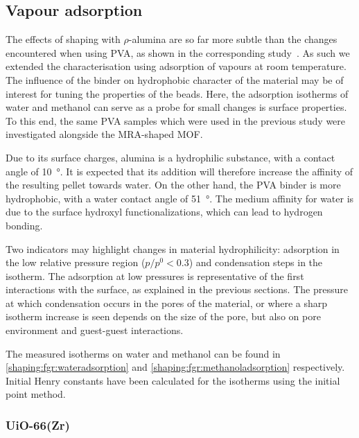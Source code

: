 
\subsection{Vapour adsorption}

The effects of shaping with \(\rho\)-alumina are 
so far more subtle than the changes encountered when using 
PVA, as shown in the corresponding 
study~\cite{chanutObservingEffectsShaping2016}.
As such we extended the characterisation using adsorption
of vapours at room temperature.
The influence of the binder on hydrophobic character of the
material may be of interest for tuning the properties of the 
beads. Here, the adsorption isotherms of water and methanol
can serve as a probe for small changes is surface properties.
To this end, the same PVA samples which were 
used in the previous study were investigated alongside 
the MRA-shaped MOF.

Due to its surface charges, alumina is a 
hydrophilic substance, with a contact 
angle of \SI{10}{\degree}. It is expected that its 
addition will therefore increase the affinity 
of the resulting pellet towards water. On the other hand,
the PVA binder is more hydrophobic, with a water contact
angle of \SI{51}{\degree}. The medium affinity for water
is due to the surface hydroxyl functionalizations, which
can lead to hydrogen bonding.

Two indicators may highlight changes in material hydrophilicity: 
adsorption in the low relative pressure region (\(p/p^0 < 0.3\)) and 
condensation steps in the isotherm. The adsorption at low
pressures is representative of the first interactions with the 
surface, as explained in the previous sections. The pressure 
at which condensation occurs in the pores of the material, or 
where a sharp isotherm increase is seen depends on the 
size of the pore, but also on pore environment and 
guest-guest interactions.

The measured isotherms on water and methanol can be found
in \autoref{shaping:fgr:wateradsorption} 
and \autoref{shaping:fgr:methanoladsorption} respectively.
Initial Henry constants have been calculated for the isotherms
using the initial point method.


\subsubsection{UiO-66(Zr)}


